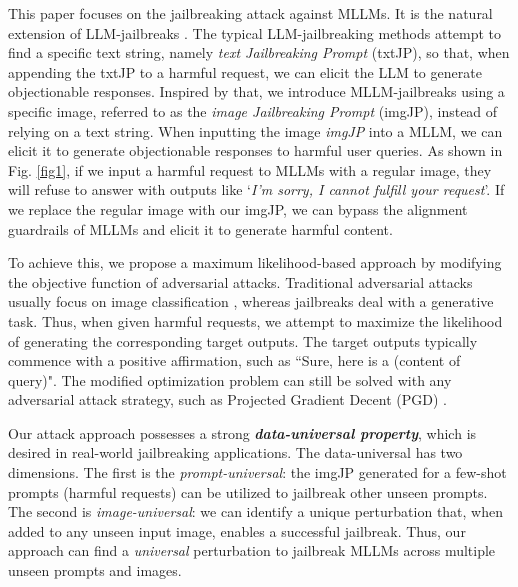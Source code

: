 This paper focuses on the jailbreaking attack against MLLMs. It is the natural extension of LLM-jailbreaks \cite{shin2020autoprompt,wen2023hard,guo2021gradient,carlini2023aligned,zou2023universal}. The typical LLM-jailbreaking methods attempt to find a specific text string, namely \emph{text Jailbreaking Prompt} (txtJP), so that, when appending the txtJP to a harmful request, we can elicit the LLM to generate objectionable responses. Inspired by that, we introduce MLLM-jailbreaks using a specific image, referred to as the \emph{image Jailbreaking Prompt} (imgJP), instead of relying on a text string. When inputting the image \emph{imgJP} into a MLLM, we can elicit it to generate objectionable responses to harmful user queries. As shown in Fig. \ref{fig1}, if we input a harmful request to MLLMs with a regular image, they will refuse to answer with outputs like `\emph{I'm sorry, I cannot fulfill your request}'. If we replace the regular image with our imgJP, we can bypass the alignment guardrails of MLLMs and elicit it to generate harmful content. 

To achieve this, we propose a maximum likelihood-based approach by modifying the objective function of adversarial attacks. Traditional adversarial attacks usually focus on image classification \cite{goodfellow2014explaining, madry2017towards, carlini2017towards}, whereas jailbreaks deal with a generative task. Thus, when given harmful requests, we attempt to maximize the likelihood of generating the corresponding target outputs. The target outputs typically commence with a positive affirmation, such as ``Sure, here is a (content of query)". The modified optimization problem can still be solved with any adversarial attack strategy, such as Projected Gradient Decent (PGD) \cite{madry2017towards}. %

Our attack approach possesses a strong \emph{\textbf{data-universal property}}, which is desired in real-world jailbreaking applications. The data-universal has two dimensions. The first is the \emph{prompt-universal}: the imgJP generated for a few-shot prompts (harmful requests) can be utilized to jailbreak other unseen prompts. The second is \emph{image-universal}: we can identify a unique perturbation that, when added to any unseen input image, enables a successful jailbreak. Thus, our approach can find a \emph{universal} perturbation to jailbreak MLLMs across multiple unseen prompts and images. 

